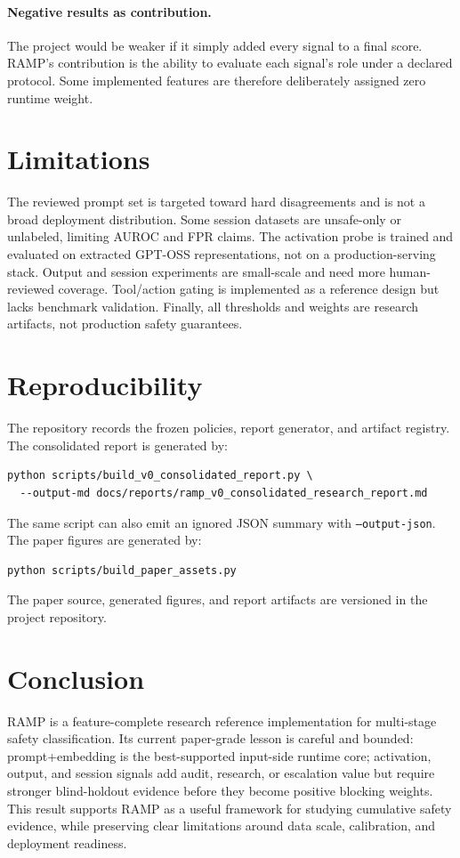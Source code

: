 \documentclass[11pt]{article}
\begin{document}
\paragraph{Negative results as contribution.}
The project would be weaker if it simply added every signal to a final score. RAMP's contribution is
the ability to evaluate each signal's role under a declared protocol. Some implemented features are
therefore deliberately assigned zero runtime weight.

\section{Limitations}

The reviewed prompt set is targeted toward hard disagreements and is not a broad deployment
distribution. Some session datasets are unsafe-only or unlabeled, limiting AUROC and FPR claims.
The activation probe is trained and evaluated on extracted GPT-OSS representations, not on a
production-serving stack. Output and session experiments are small-scale and need more human-reviewed
coverage. Tool/action gating is implemented as a reference design but lacks benchmark validation.
Finally, all thresholds and weights are research artifacts, not production safety guarantees.

\section{Reproducibility}

The repository records the frozen policies, report generator, and artifact registry. The
consolidated report is generated by:
\begin{verbatim}
python scripts/build_v0_consolidated_report.py \
  --output-md docs/reports/ramp_v0_consolidated_research_report.md
\end{verbatim}
The same script can also emit an ignored JSON summary with \texttt{--output-json}.
The paper figures are generated by:
\begin{verbatim}
python scripts/build_paper_assets.py
\end{verbatim}
The paper source, generated figures, and report artifacts are versioned in the project repository.

\section{Conclusion}

RAMP is a feature-complete research reference implementation for multi-stage safety
classification. Its current paper-grade lesson is careful and bounded: prompt+embedding is the
best-supported input-side runtime core; activation, output, and session signals add audit, research,
or escalation value but require stronger blind-holdout evidence before they become positive blocking
weights. This result
supports RAMP as a useful framework for studying cumulative safety evidence, while preserving clear
limitations around data scale, calibration, and deployment readiness.

\FloatBarrier


\end{document}
